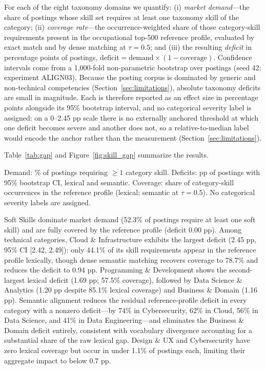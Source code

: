 \documentclass[journal]{IEEEtran}
\begin{document}
For each of the eight taxonomy domains we quantify: (i) \textit{market demand}---the share of postings whose skill set requires at least one taxonomy skill of the category; (ii) \textit{coverage rate}---the occurrence-weighted share of those category-skill requirements present in the occupational top-500 reference profile, evaluated by exact match and by dense matching at $\tau = 0.5$; and (iii) the resulting \textit{deficit} in percentage points of postings, $\text{deficit} = \text{demand} \times (1 - \text{coverage})$. Confidence intervals come from a 1,000-fold non-parametric bootstrap over postings (seed 42; experiment ALIGN03). Because the posting corpus is dominated by generic and non-technical competencies (Section~\ref{sec:limitations}), absolute taxonomy deficits are small in magnitude. Each is therefore reported as an effect size in percentage points alongside its 95\% bootstrap interval, and no categorical severity label is assigned: on a 0--2.45 pp scale there is no externally anchored threshold at which one deficit becomes severe and another does not, so a relative-to-median label would encode the anchor rather than the measurement (Section~\ref{sec:limitations}).

Table~\ref{tab:gap} and Figure~\ref{fig:skill_gap} summarize the results.

\begin{table}[!htbp]
\centering
\caption{Domain-Level Skill Gaps Across Taxonomy Categories (ALIGN03)}
\label{tab:gap}
\resizebox{\columnwidth}{!}{%

}
\par\vspace{3pt}
{\footnotesize Demand: \% of postings requiring $\ge 1$ category skill. Deficits: pp of postings with 95\% bootstrap CI, lexical and semantic. Coverage: share of category-skill occurrences in the reference profile (lexical; semantic at $\tau = 0.5$). No categorical severity labels are assigned.}
\end{table}

Soft Skills dominate market demand (52.3\% of postings require at least one soft skill) and are fully covered by the reference profile (deficit $0.00$ pp). Among technical categories, Cloud \& Infrastructure exhibits the largest deficit (2.45 pp, 95\% CI [2.42, 2.49]): only 44.1\% of its skill requirements appear in the reference profile lexically, though dense semantic matching recovers coverage to 78.7\% and reduces the deficit to 0.94 pp. Programming \& Development shows the second-largest lexical deficit (1.69 pp; 57.5\% coverage), followed by Data Science \& Analytics (1.20 pp despite 85.1\% lexical coverage) and Business \& Domain (1.16 pp). Semantic alignment reduces the residual reference-profile deficit in every category with a nonzero deficit---by 74\% in Cybersecurity, 62\% in Cloud, 56\% in Data Science, and 41\% in Data Engineering---and eliminates the Business \& Domain deficit entirely, consistent with vocabulary divergence accounting for a substantial share of the raw lexical gap. Design \& UX and Cybersecurity have zero lexical coverage but occur in under 1.1\% of postings each, limiting their aggregate impact to below 0.7 pp.
\end{document}
